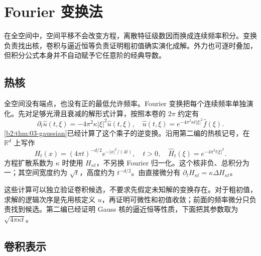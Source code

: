 \section{Fourier 变换法}
\label{b2:sec:1202}

在全空间中，空间平移不会改变方程，离散特征级数因而换成连续频率积分。变换负责找出核，卷积与逼近恒等负责证明粗初值确实演化成解。外力也可逐时叠加，但积分公式本身并不自动赋予它任意阶的经典导数。

\subsection{热核}
\label{b2:subsec:120201}

全空间没有端点，也没有正的最低允许频率。Fourier 变换把每个连续频率单独演化。先对足够光滑且衰减的解形式计算，按照本卷的 \(2\pi\) 约定有
\[
 \partial_t\widehat u(t,\xi)
 =-4\pi^2\kappa|\xi|^2\widehat u(t,\xi),
 \quad\widehat u(t,\xi)=e^{-4\pi^2\kappa t|\xi|^2}\widehat f(\xi).
\]
\cref{b2:thm:03-gaussian}已经计算了这个乘子的逆变换。沿用第二编的热核记号，在 \(\mathbb R^d\) 上写作
\begin{equation}\label{b2:eq:12-gauss-heat}
 H_t(x)=(4\pi t)^{-d/2}e^{-|x|^2/(4t)},
 \quad t>0,
 \quad\widehat H_t(\xi)=e^{-4\pi^2t|\xi|^2}.
\end{equation}
方程扩散系数为 \(\kappa\) 时使用 \(H_{\kappa t}\)，不另换 Fourier 归一化。这个核非负、总积分为一；其空间宽度约为 \(\sqrt t\)，高度约为 \(t^{-d/2}\)。由直接微分有 \(\partial_tH_{\kappa t}=\kappa\Delta H_{\kappa t}\)。

\ProseParagraphBreak

这些计算可以独立验证卷积候选，不要求先假定未知解的变换存在。对于粗初值，求解的逻辑次序是先用核定义 \(u\)，再证明可微性和初值收敛；前面的频率微分只负责找到候选。第二编已经证明 Gauss 核的逼近恒等性质，下面把其参数取为 \(\sqrt{4\pi\kappa t}\)。

\subsection{卷积表示}
\label{b2:subsec:120202}


